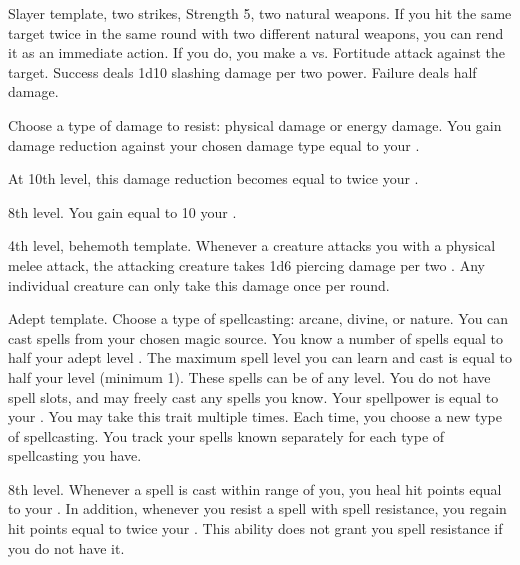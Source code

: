     \featpres Slayer template, two strikes, Strength 5, two natural weapons.
    \featben If you hit the same target twice in the same round with two different natural weapons, you can rend it as an immediate action.
    If you do, you make a  vs. Fortitude attack against the target.
    Success deals 1d10 slashing damage per two power.
    Failure deals half damage.

     Choose a type of damage to resist: physical damage or energy damage.
    \featben You gain damage reduction against your chosen damage type equal to your .

    At 10th level, this damage reduction becomes equal to twice your .

    \featpre 8th level.
    \featben You gain  equal to 10 \add your .

    \featpre 4th level, behemoth template.
    \featben Whenever a creature attacks you with a physical melee attack, the attacking creature takes 1d6 piercing damage per two .
    Any individual creature can only take this damage once per round.

    \featpre Adept template.
     Choose a type of spellcasting: arcane, divine, or nature.
    \featben You can cast spells from your chosen magic source.
    You know a number of spells equal to half your adept level .
    The maximum spell level you can learn and cast is equal to half your level (minimum 1).
    These spells can be of any level.
    You do not have spell slots, and may freely cast any spells you know.
    Your spellpower is equal to your .
     You may take this trait multiple times.
    Each time, you choose a new type of spellcasting.
    You track your spells known separately for each type of spellcasting you have.

    \featpre 8th level.
    \featben Whenever a spell is cast within \rngmed range of you, you heal hit points equal to your .
    In addition, whenever you resist a spell with spell resistance, you regain hit points equal to twice your .
    This ability does not grant you spell resistance if you do not have it.


